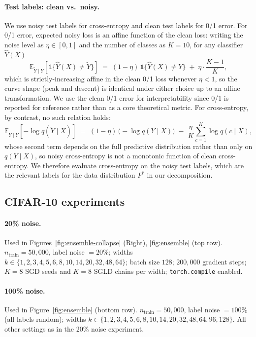 \paragraph{Test labels: clean vs.\ noisy.}
We use noisy test labels for cross-entropy and clean test labels for 0/1
error. For 0/1 error, expected noisy loss is an affine function of the
clean loss: writing the noise level as $\eta\in[0,1]$ and the number of
classes as $K=10$, for any classifier $\hat Y(X)$
\begin{equation}
\mathbb{E}_{\widetilde{Y}\mid Y}\!\left[\mathbb{1}\{\hat Y(X) \ne \widetilde{Y}\}\right]
\;=\; (1-\eta)\,\mathbb{1}\{\hat Y(X) \ne Y\}
\;+\; \eta\cdot\frac{K-1}{K},
\end{equation}
which is strictly-increasing affine in the clean 0/1 loss whenever
$\eta<1$, so the curve shape (peak and descent) is identical under either
choice up to an affine transformation. We use the clean 0/1 error for
interpretability since 0/1 is reported for reference rather than as a core
theoretical metric. For cross-entropy, by contrast, no such relation
holds:
\begin{equation}
\mathbb{E}_{\widetilde{Y}\mid Y}\!\left[-\log q(\widetilde{Y}\mid X)\right]
\;=\; (1-\eta)\,\bigl(-\log q(Y\mid X)\bigr)
\;-\; \frac{\eta}{K}\sum_{c=1}^{K} \log q(c\mid X),
\end{equation}
whose second term depends on the full predictive distribution rather
than only on $q(Y\mid X)$, so noisy cross-entropy is not a monotonic
function of clean cross-entropy. We therefore evaluate cross-entropy on
the noisy test labels, which are the relevant labels for the data
distribution $P^*$ in our decomposition.

\subsection{CIFAR-10 experiments}

\paragraph{20\% noise.}
Used in Figures~\ref{fig:ensemble-collapse} (Right), \ref{fig:ensemble}
(top row).
$n_{\mathrm{train}} = 50{,}000$, label noise $= 20\%$;
widths $k \in \{1, 2, 3, 4, 5, 6, 8, 10, 14, 20, 32, 48, 64\}$;
batch size $128$; $200{,}000$ gradient steps;
$K=8$ SGD seeds and $K=8$ SGLD chains per width;
\texttt{torch.compile} enabled.

\paragraph{100\% noise.}
Used in Figure~\ref{fig:ensemble} (bottom row).
$n_{\mathrm{train}} = 50{,}000$, label noise $= 100\%$ (all labels random);
widths $k \in \{1, 2, 3, 4, 5, 6, 8, 10, 14, 20, 32, 48, 64, 96, 128\}$.
All other settings as in the 20\% noise experiment.

